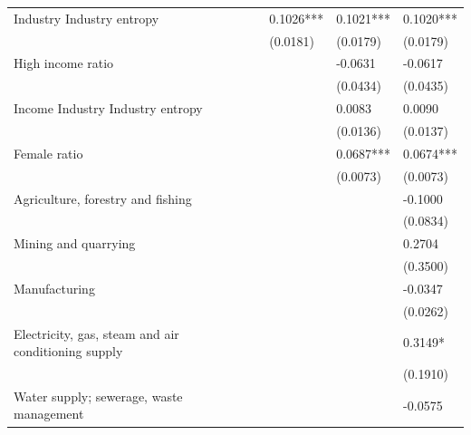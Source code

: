 \begin{table}
\begin{center}
\begin{tabular}{llllll}
Industry Industry entropy                              &             &            & 0.1026***    & 0.1021***       & 0.1020***         \\
                                     &             &            & (0.0181)     & (0.0179)        & (0.0179)          \\
High income ratio              &             &            &              & -0.0631         & -0.0617           \\
                                     &             &            &              & (0.0434)        & (0.0435)          \\
Income Industry Industry entropy                   &             &            &              & 0.0083          & 0.0090            \\
                                     &             &            &              & (0.0136)        & (0.0137)          \\
Female ratio                &             &            &              & 0.0687***       & 0.0674***         \\
                                     &             &            &              & (0.0073)        & (0.0073)          \\
Agriculture, forestry and fishing &             &            &              &                 & -0.1000           \\
                                     &             &            &              &                 & (0.0834)          \\
Mining and quarrying &             &            &              &                 & 0.2704            \\
                                     &             &            &              &                 & (0.3500)          \\
Manufacturing &             &            &              &                 & -0.0347           \\
                                     &             &            &              &                 & (0.0262)          \\
Electricity, gas, steam and air conditioning supply &             &            &              &                 & 0.3149*           \\
                                     &             &            &              &                 & (0.1910)          \\
Water supply; sewerage, waste management &             &            &              &                 & -0.0575           \\

\end{tabular}
\end{center}
\end{table}
